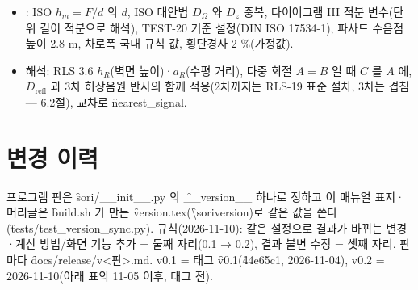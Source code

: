 \documentclass[10.5pt,a4paper]{article}
\begin{document}
\begin{itemize}
\item \nob: ISO $h_m = F/d$ 의 $d$, ISO 대안법 $D_\Omega$ 와 $D_z$ 중복, 다이어그램 III 적분 변수(단위 길이 적분으로 해석), TEST-20 기준 설정(DIN ISO 17534-1), 파사드 수음점 높이 2.8 m, 차로폭 국내 규칙 값, 횡단경사 2 \%(가정값).
\item 해석: RLS 3.6 $h_R$(벽면 높이)·$a_R$(수평 거리), 다중 회절 $A = B$ 일 때 $C$ 를 $A$ 에, $D_\mathrm{refl}$ 과 3차 허상음원 반사의 함께 적용(2차까지는 RLS-19 표준 절차, 3차는 겹침 — 6.2절), 교차로 \f{nearest\_signal}.
\end{itemize}

\section{변경 이력}
 프로그램 판은 \f{sori/\_\_init\_\_.py} 의 \f{\_\_version\_\_} 하나로 정하고 이 매뉴얼 표지·머리글은 \f{build.sh} 가 만든 \f{version.tex}(\f{\textbackslash soriversion})로 같은 값을 쓴다(\f{tests/test\_version\_sync.py}). 규칙(2026-11-10): 같은 설정으로 결과가 바뀌는 변경·계산 방법/화면 기능 추가 = 둘째 자리(0.1 → 0.2), 결과 불변 수정 = 셋째 자리. 판마다 \f{docs/release/v<판>.md}. v0.1 = 태그 \f{v0.1}(\f{44e65c1}, 2026-11-04), v0.2 = 2026-11-10(아래 표의 11-05 이후, 태그 전).
\end{document}
